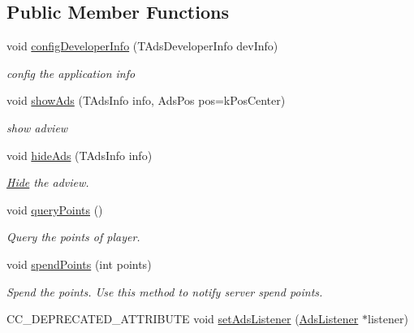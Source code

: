 \subsection*{Public Member Functions}
\begin{DoxyCompactItemize}
\item 
void \hyperlink{classcocos2d_1_1plugin_1_1ProtocolAds_a4fc710e3937e28cbd03e2820b7517f9c}{config\+Developer\+Info} (T\+Ads\+Developer\+Info dev\+Info)
\begin{DoxyCompactList}\small\item\em config the application info \end{DoxyCompactList}\item 
void \hyperlink{classcocos2d_1_1plugin_1_1ProtocolAds_ab645861aadce7f9736169e66bc30110e}{show\+Ads} (T\+Ads\+Info info, Ads\+Pos pos=k\+Pos\+Center)
\begin{DoxyCompactList}\small\item\em show adview \end{DoxyCompactList}\item 
void \hyperlink{classcocos2d_1_1plugin_1_1ProtocolAds_a43a0b1574b54ced4ca21616fad379859}{hide\+Ads} (T\+Ads\+Info info)
\begin{DoxyCompactList}\small\item\em \hyperlink{classHide}{Hide} the adview. \end{DoxyCompactList}\item 
\mbox{\label{classcocos2d_1_1plugin_1_1ProtocolAds_af06a1c9f37a85b51447c4c37493a04e1}} 
void \hyperlink{classcocos2d_1_1plugin_1_1ProtocolAds_af06a1c9f37a85b51447c4c37493a04e1}{query\+Points} ()
\begin{DoxyCompactList}\small\item\em Query the points of player. \end{DoxyCompactList}\item 
void \hyperlink{classcocos2d_1_1plugin_1_1ProtocolAds_afb4e3dc087a9cd9e3a4779198cb4a2da}{spend\+Points} (int points)
\begin{DoxyCompactList}\small\item\em Spend the points. Use this method to notify server spend points. \end{DoxyCompactList}\item 
C\+C\+\_\+\+D\+E\+P\+R\+E\+C\+A\+T\+E\+D\+\_\+\+A\+T\+T\+R\+I\+B\+U\+TE void \hyperlink{classcocos2d_1_1plugin_1_1ProtocolAds_a2ea6f225787b7f62431d2fd695b753c6}{set\+Ads\+Listener} (\hyperlink{classcocos2d_1_1plugin_1_1AdsListener}{Ads\+Listener} $\ast$listener)

\end{DoxyCompactItemize}
